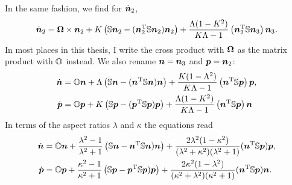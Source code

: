 \documentclass[thesis.tex]{subfiles}
\begin{document}
In the same fashion, we find for $\dot{\ve n}_2$,
\begin{align*}
	\dot{\ve n}_2= \ve \Omega \cross \ve n_2
	+ K\left(
	\ma S \ve n_2 - (\ve n_2 \transpose \ma S \ve n_2) \ve n_2
	\right)
    + \frac{\Lambda(1-K^2)}{K \Lambda - 1}\left(\ve n_2\transpose \ma S\ve n_3\right)\ve n_3. 
\end{align*}
In most places in this thesis, I write the cross product with $\ve \Omega$ as the matrix product with $\ma O$ instead. We also rename $\ve n = \ve n_3$ and $\ve p = \ve n_2$:
\begin{align*}
	\dot{\ve n}	&= \ma O \ve n 
	+ \Lambda\left(
	\ma S \ve n - (\ve n \transpose \ma S \ve n) \ve n
	\right)
    + \frac{K(1- \Lambda^2)}{K \Lambda - 1}\left(\ve n\transpose \ma S\ve p\right)\ve p, \\
\dot{\ve p}	&=    \ma O \ve p
	 + K\left(
\ma S \ve p  - (\ve p \transpose \ma S \ve p) \ve p
	 \right)
	  + \frac{\Lambda(1-K^2)}{K \Lambda - 1}\left(\ve n\transpose \ma S\ve p\right)\ve n
\end{align*}
In terms of the aspect ratios $\lambda$ and $\kappa$ the equations read
\begin{align*}
	\dot{\ve n} &= \ma O \ve{n} + \frac{\lambda^2-1}{\lambda^2+1} \left(\ma S \ve n- \ve{n}\transpose \ma S \ve{n})\ve{n}\right) + \frac{ 2\lambda^2 (1 - \kappa^2) }{(\lambda^2+\kappa^2)(\lambda^2+1)}(\ve{n}\transpose \ma S \ve{p})\ve{p}, \nn\\
	\dot{\ve p} &= \ma O \ve{p} + \frac{\kappa^2-1}{\kappa^2+1}\left(\ma S \ve p - \ve{p}\transpose \ma S \ve{p})\ve{p}\right) + \frac{ 2\kappa^2 (1 - \lambda^2) }{(\kappa^2+\lambda^2)(\kappa^2+1)}(\ve{n}\transpose \ma S \ve{p})\ve{n}.
\end{align*}
\end{document}
